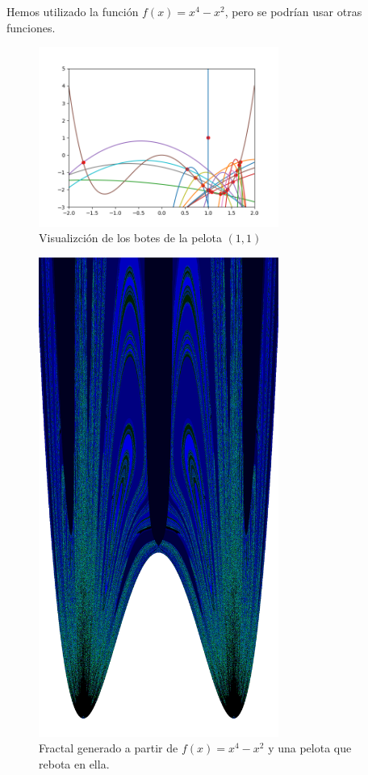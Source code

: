 \noindent Hemos utilizado la función $f(x)= x^4 - x^2$, pero se podrían usar otras funciones.

\begin{figure}[H]
    \centering
    \includegraphics[width=0.7\textwidth]{figures/ball.png}
    \caption{Visualizción de los botes de la pelota $(1,1)$}
    \label{fig:ball-(1,1)}
\end{figure}

\begin{figure}[H]
    \centering
    \includegraphics[width=0.7\textwidth]{figures/bouncing-ball-fractal.png}
    \caption{Fractal generado a partir de $f(x) = x^4 - x^2$ y una pelota que rebota en ella.}
    \label{fig:ball-fractal}
\end{figure}

